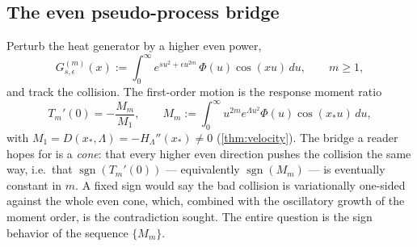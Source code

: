 \documentclass[11pt,reqno]{amsart}
\theoremstyle{plain}
\theoremstyle{definition}
\theoremstyle{remark}
\DeclareMathOperator{\sgn}{sgn}
\begin{document}
\subsection*{The even pseudo-process bridge}
Perturb the heat generator by a higher even power,
\begin{equation}\label{eq:Gm}
  G^{(m)}_{s,\epsilon}(x):=\int_0^\infty
  e^{su^2+\epsilon u^{2m}}\,\Phi(u)\cos(xu)\,du,\qquad m\ge1,
\end{equation}
and track the collision. The first-order motion is the response moment
ratio
\begin{equation}\label{eq:Tm}
  T_m'(0)=-\frac{M_m}{M_1},\qquad
  M_m:=\int_0^\infty u^{2m}e^{\Lambda u^2}\Phi(u)\cos(x_*u)\,du,
\end{equation}
with $M_1=D(x_*,\Lambda)=-H_\Lambda''(x_*)\neq0$
(\cref{thm:velocity}). The bridge a reader hopes for is a \emph{cone}: that
every higher even direction pushes the collision the same way, i.e.\ that
$\sgn(T_m'(0))$ --- equivalently $\sgn(M_m)$ --- is eventually constant in
$m$. A fixed sign would say the bad collision is variationally one-sided
against the whole even cone, which, combined with the oscillatory growth of
the moment order, is the contradiction sought. The entire question is the
sign behavior of the sequence $\{M_m\}$.
\end{document}
